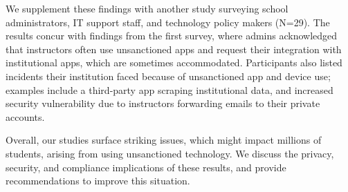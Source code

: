 


We supplement these findings with another study surveying school administrators, IT support staff, and technology policy makers (N=29). The results concur with findings from the first survey, where admins acknowledged that instructors often use unsanctioned apps and request their integration with institutional apps, which are sometimes accommodated. Participants also listed \SP incidents their institution faced because of unsanctioned app and device use; examples include a third-party app scraping institutional data, and increased security vulnerability due to instructors forwarding emails to their private accounts. 

Overall, our studies surface striking \SP issues, which might impact millions of students, arising from using unsanctioned technology. We discuss the privacy, security, and compliance implications of these results, and provide recommendations to improve this situation. 

